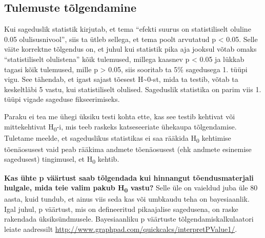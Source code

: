 \documentclass[]{book}
\begin{document}
\subsection*{Tulemuste tõlgendamine}\label{tulemuste-tolgendamine-1}

Kui sageduslik statistik kirjutab, et tema ``efekti suurus on
statistiliselt oluline 0.05 olulisusnivool'', siis ta ütleb sellega, et
tema poolt arvutatud p \textless{} 0.05. Selle väite korrektne tõlgendus
on, et juhul kui statistik pika aja jooksul võtab omaks ``statistiliselt
olulistena'' kõik tulemused, millega kaasnev p \textless{} 0.05 ja
lükkab tagasi kõik tulemused, mille p \textgreater{} 0.05, siis sooritab
ta 5\% sagedusega 1. tüüpi vigu. See tähendab, et igast sajast tõesest
H\textasciitilde{}0-st, mida ta testib, võtab ta keskeltläbi 5 vastu,
kui statistiliselt olulised. Sageduslik statistika on parim viis 1.
tüüpi vigade sageduse fikseerimiseks.

Paraku ei tea me ühegi üksiku testi kohta ette, kas see testib kehtivat
või mittekehtivat H\textsubscript{0}-i, mis teeb raskeks katseseeriate
ühekaupa tõlgendamise. Tuletame meelde, et sageduslikus statistikas ei
saa rääkida H\textsubscript{0} kehtimise tõenäosusest vaid peab rääkima
andmete tõenäosusest (ehk andmete esinemise sagedusest) tingimusel, et
H\textsubscript{0} kehtib.

\textbf{Kas ühte p väärtust saab tõlgendada kui hinnangut
tõendusmaterjali hulgale, mida teie valim pakub H\textsubscript{0}
vastu?} Selle üle on vaieldud juba üle 80 aasta, kuid tundub, et ainus
viis seda kas või umbkaudu teha on bayesiaanlik. Igal juhul, p väärtust,
mis on defineeritud pikaajalise sagedusena, on raske rakendada
üksiksündmusele. Bayesiaanliku p väärtuste tõlgendamiskalkulaatori
leiate aadressilt
\url{http://www.graphpad.com/quickcalcs/interpretPValue1/}.
\end{document}
